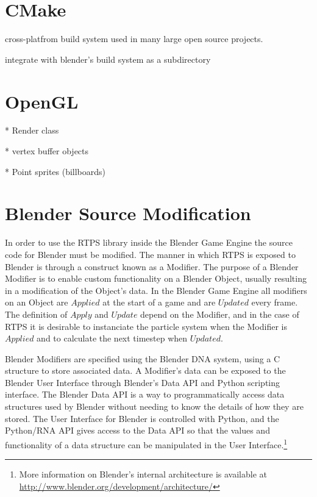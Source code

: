 \section{CMake}
cross-platfrom build system used in many large open source projects.


integrate with blender's build system as a subdirectory


\section{OpenGL}
* Render class


* vertex buffer objects


* Point sprites (billboards)




\section{Blender Source Modification}

In order to use the RTPS library inside the Blender Game Engine the source code
for Blender must be modified. The manner in which RTPS is exposed to Blender is
through a construct known as a Modifier. The purpose of a Blender Modifier is
to enable custom functionality on a Blender Object, usually resulting in a
modification of the Object's data. In the Blender Game Engine all modifiers on an Object are
$Applied$ at the start of a game and are $Updated$ every frame. The definition
of $Apply$ and $Update$ depend on the Modifier, and in the case of RTPS it is
desirable to instanciate the particle system when the Modifier is $Applied$ and
to calculate the next timestep when $Updated$.


Blender Modifiers are specified using the Blender DNA system, using a C
structure to store associated data. A Modifier's data can be exposed to the Blender User Interface
through Blender's Data API and Python scripting interface. The Blender Data API
is a way to programmatically access data structures used by Blender without
needing to know the details of how they are stored.\cite{b3dDataAPI} The User
Interface for Blender is controlled with Python, and the Python/RNA API gives
access to the Data API so that the values and functionality of a data structure
can be manipulated in the User Interface.\footnote{More information on
Blender's internal architecture is available at
\url{http://www.blender.org/development/architecture/}}


